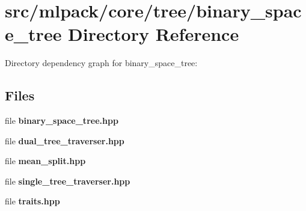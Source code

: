 \section{src/mlpack/core/tree/binary\-\_\-space\-\_\-tree Directory Reference}
\label{dir_a1576826d045c2c1d577adde55308f0f}
Directory dependency graph for binary\-\_\-space\-\_\-tree\-:
\subsection*{Files}
\begin{DoxyCompactItemize}
\item 
file {\bf binary\-\_\-space\-\_\-tree.\-hpp}
\item 
file {\bf dual\-\_\-tree\-\_\-traverser.\-hpp}
\item 
file {\bf mean\-\_\-split.\-hpp}
\item 
file {\bf single\-\_\-tree\-\_\-traverser.\-hpp}
\item 
file {\bf traits.\-hpp}
\end{DoxyCompactItemize}
